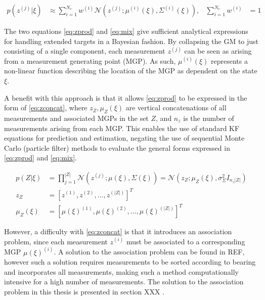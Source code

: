 \begin{align}
    p(z^{(j)}|\xi) &\approx \sum\limits_{i=1}^{N_c} w^{(i)}\mathcal{N}(z^{(j)};\mu^{(i)}(\xi),\Sigma^{(i)}(\xi)), &  \sum\limits_{i=1}^{N_c} w^{(i)} &= 1 \label{eq:mix}
\end{align}

The two equations \eqref{eq:zprod} and \eqref{eq:mix} give sufficient analytical expressions for handling extended targets in a Bayesian fashion. By collapsing the GM to just consisting of a single component, each measurement $z^{(j)}$ can be seen as arising from a measurement generating point (MGP). As such, $\mu^{(i)}(\xi)$ represents a non-linear function describing the location of the MGP as dependent on the state $\xi$.

A benefit with this approach is that it allows \eqref{eq:zprod} to be expressed in the form of \eqref{eq:zconcat}, where $z_{Z}, \mu_{Z}(\xi)$ are vertical concatenations of all measurements and associated MGPs in the set $Z$, and $n_z$ is the number of measurements arising from each MGP. This enables the use of standard KF equations for prediction and estimation, negating the use of sequential Monte Carlo (particle filter) methods to evaluate the general forms expressed in \eqref{eq:zprod} and \eqref{eq:mix}. 

\begin{equation}
    \begin{split}
        p(Z|\xi) &= \prod\limits_{j=1}^{|Z|} \mathcal{N}(z^{(j)};\mu(\xi),\Sigma(\xi)) = \mathcal{N}(z_{Z}; \mu_{Z}(\xi), \sigma^2_{\Sigma}I_{n_z|Z|}) \\
            z_{Z} &= [z^{(1)}, z^{(2)}, \hdots, z^{(|Z|)}]^T \\
        \mu_{Z}(\xi) &= [\mu(\xi)^{(1)}, \mu(\xi)^{(2)}, \hdots, \mu(\xi)^{(|Z|)}]^T
    \end{split}\label{eq:zconcat}
\end{equation}

However, a difficulty with \eqref{eq:zconcat} is that it introduces an association problem, since each measurement $z^{(i)}$ must be associated to a corresponding MGP $\mu(\xi)^{(i)}$. A solution to the association problem can be found in REF, however such a solution requires measurements to be sorted according to bearing and incorporates all measurements, making such a method computationally intensive for a high number of measurements. The solution to the association problem in this thesis is presented in section XXX .

